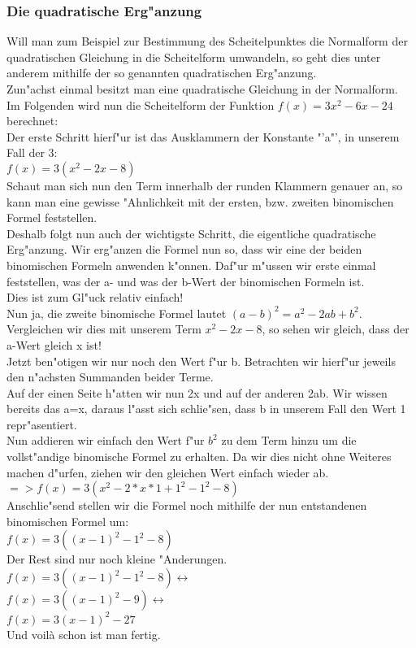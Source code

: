 \subsubsection{Die quadratische Erg"anzung}
Will man zum Beispiel zur Bestimmung des Scheitelpunktes die Normalform der quadratischen Gleichung in die Scheitelform umwandeln, so geht dies unter anderem mithilfe der so genannten quadratischen Erg"anzung.\\
Zun"achst einmal besitzt man eine quadratische Gleichung in der Normalform.\\
Im Folgenden wird nun die Scheitelform der Funktion $f(x)=3x^2-6x-24$ berechnet:\\
Der erste Schritt hierf"ur ist das Ausklammern der Konstante "'a"', in unserem Fall der 3:\\
$f(x)=3(x^2-2x-8)$\\
Schaut man sich nun den Term innerhalb der runden Klammern genauer an, so kann man eine gewisse "Ahnlichkeit mit der ersten, bzw. zweiten binomischen Formel feststellen.\\
Deshalb folgt nun auch der wichtigste Schritt, die eigentliche quadratische Erg"anzung. Wir erg"anzen die Formel nun so, dass wir eine der beiden binomischen Formeln anwenden k"onnen. Daf"ur m"ussen wir erste einmal feststellen, was der a- und was der b-Wert der binomischen Formeln ist.\\
Dies ist zum Gl"uck relativ einfach!\\
Nun ja, die zweite binomische Formel lautet $(a-b)^2=a^2-2ab+b^2$. Vergleichen wir dies mit unserem Term $x^2-2x-8$, so sehen wir gleich, dass der a-Wert gleich x ist!\\
Jetzt ben"otigen wir nur noch den Wert f"ur b. Betrachten wir hierf"ur jeweils den n"achsten Summanden beider Terme.\\
Auf der einen Seite h"atten wir nun 2x und auf der anderen 2ab. Wir wissen bereits das a=x, daraus l"asst sich schlie"sen, dass b in unserem Fall den Wert 1 repr"asentiert.\\
Nun addieren wir einfach den Wert f"ur $b^2$ zu dem Term hinzu um die vollst"andige binomische Formel zu erhalten. Da wir dies nicht ohne Weiteres machen d"urfen, ziehen wir den gleichen Wert einfach wieder ab.\\
$=> f(x)=3(x^2 - 2*x*1 +1^2 -1^2 -8)$\\
Anschlie"send stellen wir die Formel noch mithilfe der nun entstandenen binomischen Formel um:\\
$f(x)=3((x-1)^2-1^2-8)$\\
Der Rest sind nur noch kleine "Anderungen.\\
$f(x)=3((x-1)^2-1^2-8) \leftrightarrow$\\
$f(x)=3((x-1)^2-9) \leftrightarrow$\\
$f(x)=3(x-1)^2-27$\\
Und voil\`a schon ist man fertig.

